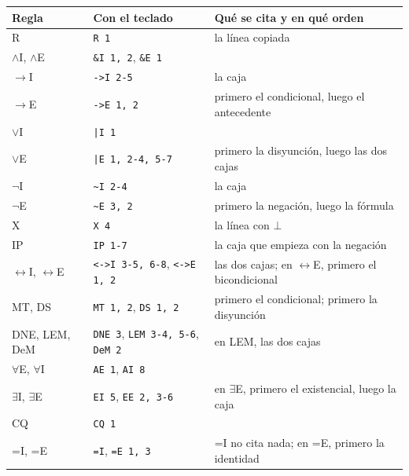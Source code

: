 \documentclass[a4paper,spanish,11pt]{article}
\newcommand{\tecla}[1]{\texttt{#1}}
\begin{document}
\begin{center}
\small
\begin{tabular}{lll}
\hline
\textbf{Regla} & \textbf{Con el teclado} & \textbf{Qué se cita y en qué orden} \\
\hline
R & \tecla{R 1} & la línea copiada \\
$\land$I, $\land$E & \tecla{\&I 1, 2}, \tecla{\&E 1} &  \\
$\to$I & \tecla{->I 2-5} & la caja \\
$\to$E & \tecla{->E 1, 2} & primero el condicional, luego el antecedente \\
$\lor$I & \tecla{|I 1} &  \\
$\lor$E & \tecla{|E 1, 2-4, 5-7} & primero la disyunción, luego las dos cajas \\
$\neg$I & \tecla{\textasciitilde I 2-4} & la caja \\
$\neg$E & \tecla{\textasciitilde E 3, 2} & primero la negación, luego la fórmula \\
X & \tecla{X 4} & la línea con $\bot$ \\
IP & \tecla{IP 1-7} & la caja que empieza con la negación \\
$\leftrightarrow$I, $\leftrightarrow$E & \tecla{<->I 3-5, 6-8}, \tecla{<->E 1, 2} & las dos cajas; en $\leftrightarrow$E, primero el bicondicional \\
MT, DS & \tecla{MT 1, 2}, \tecla{DS 1, 2} & primero el condicional; primero la disyunción \\
DNE, LEM, DeM & \tecla{DNE 3}, \tecla{LEM 3-4, 5-6}, \tecla{DeM 2} & en LEM, las dos cajas \\
$\forall$E, $\forall$I & \tecla{AE 1}, \tecla{AI 8} &  \\
$\exists$I, $\exists$E & \tecla{EI 5}, \tecla{EE 2, 3-6} & en $\exists$E, primero el existencial, luego la caja \\
CQ & \tecla{CQ 1} &  \\
=I, =E & \tecla{=I}, \tecla{=E 1, 3} & =I no cita nada; en =E, primero la identidad \\
\hline
\end{tabular}
\end{center}
\end{document}
